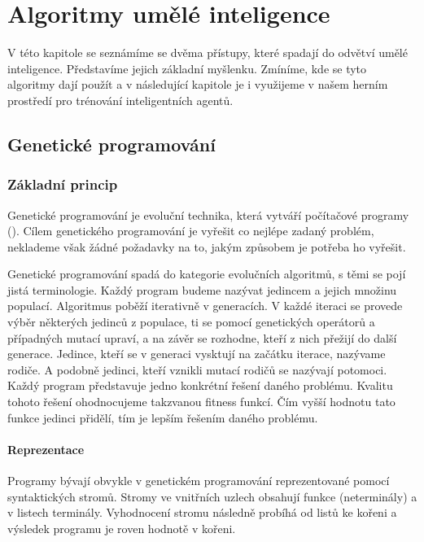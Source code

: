 \chapter{Algoritmy umělé inteligence}
V této kapitole se seznámíme se dvěma přístupy, které spadají do odvětví umělé inteligence. 
Představíme jejich základní myšlenku. Zmíníme, kde se tyto algoritmy dají použít a v následující kapitole je i využijeme v našem herním prostředí pro trénování inteligentních agentů.

\section{Genetické programování}

\subsection{Základní princip}

Genetické programování je evoluční technika, která vytváří počítačové programy (\cite{fieldguide}). Cílem genetického programování je vyřešit co nejlépe zadaný problém, neklademe však žádné požadavky na to, jakým způsobem je potřeba ho vyřešit.
\par
Genetické programování spadá do kategorie evolučních algoritmů, s těmi se pojí jistá terminologie.
Každý program budeme nazývat jedincem a jejich množinu populací. Algoritmus poběží iterativně v generacích. 
V každé iteraci se provede výběr některých jedinců z populace, ti se pomocí genetických operátorů a případných mutací upraví, a na závěr se rozhodne, kteří z nich přežijí do další generace.
Jedince, kteří se v generaci vysktují na začátku iterace, nazývame rodiče. 
A podobně jedinci, kteří vznikli mutací rodičů se nazývají potomoci.
Každý program představuje jedno konkrétní řešení daného problému. Kvalitu tohoto řešení ohodnocujeme takzvanou fitness funkcí. Čím vyšší hodnotu tato funkce jedinci přidělí, tím je lepším řešením daného problému.


\subsubsection{Reprezentace}

Programy bývají obvykle v genetickém programování reprezentované pomocí syntaktických stromů. Stromy ve vnitřních uzlech obsahují funkce (neterminály) a v listech terminály.
Vyhodnocení stromu následně probíhá od listů ke kořeni a výsledek programu je roven hodnotě v kořeni.


